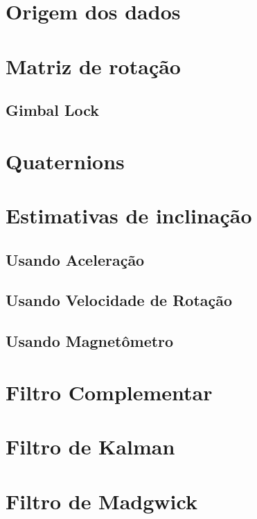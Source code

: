\section{Origem dos dados}
\section{Matriz de rotação}
    \subsection{Gimbal Lock}
\section{Quaternions}
\section{Estimativas de inclinação}
    \subsection{Usando Aceleração}
    \subsection{Usando Velocidade de Rotação}
    \subsection{Usando Magnetômetro}

\section{Filtro Complementar}
\section{Filtro de Kalman}
\section{Filtro de Madgwick}
